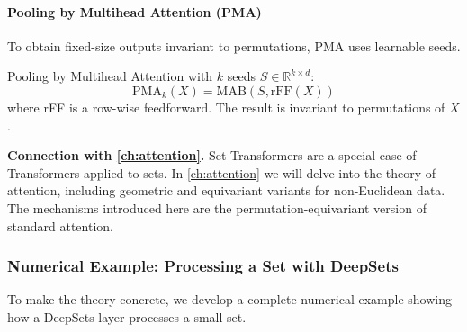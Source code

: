 \paragraph{Pooling by Multihead Attention (PMA)}

To obtain fixed-size outputs invariant to permutations, PMA uses learnable seeds.

\begin{definition}[PMA]\label{def:pma}
Pooling by Multihead Attention with $k$ seeds $S \in \mathbb{R}^{k \times d}$:
\begin{equation}
\text{PMA}_k(X) = \text{MAB}(S, \text{rFF}(X))
\end{equation}
where rFF is a row-wise feedforward. The result is invariant to permutations of $X$.
\end{definition}

\textbf{Connection with \autoref{ch:attention}.} Set Transformers are a special case of Transformers applied to sets. In \autoref{ch:attention} we will delve into the theory of attention, including geometric and equivariant variants for non-Euclidean data. The mechanisms introduced here are the permutation-equivariant version of standard attention.

\subsubsection{Numerical Example: Processing a Set with DeepSets}

To make the theory concrete, we develop a complete numerical example showing how a DeepSets layer processes a small set.

